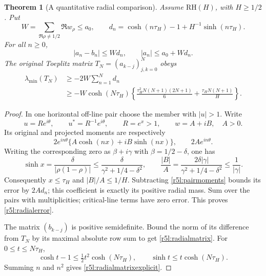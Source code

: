 \documentclass[11pt,a4paper]{article}
\newtheorem{theorem}{Theorem}[section]
\theoremstyle{definition}\newtheorem{definition}[theorem]{Definition}
\theoremstyle{remark}\newtheorem{remark}[theorem]{Remark}
\numberwithin{equation}{section}
\begin{document}
\begin{theorem}[A quantitative radial comparison]
\label{r5l:radialbound}
Assume $\mathrm{RH}(H)$, with $H\ge1/2$.  Put
\[
 W=\sum_{\Re\rho\ne1/2}\Re w_\rho\le a_0,
 \qquad
 d_n=\cosh(n\tau_H)-1+H^{-1}\sinh(n\tau_H).
\]
For all $n\ge0$,
\begin{equation}\label{r5l:radialerror}
 |a_n-b_n|\le Wd_n,
 \qquad |a_n|\le a_0+Wd_n.
\end{equation}
The original Toeplitz matrix $T_N=(a_{k-j})_{j,k=0}^N$ obeys
\begin{align}
 \lambda_{\min}(T_N)
 &\ge-2W\sum_{n=1}^Nd_n\label{r5l:radialmatrix}\\
 &\ge-W\cosh(N\tau_H)
 \left\{\frac{\tau_H^2N(N+1)(2N+1)}6
              +\frac{\tau_HN(N+1)}H\right\}.
       \label{r5l:radialmatrixexplicit}
\end{align}
\end{theorem}
\begin{proof}
In one horizontal off-line pair choose the member with $|u|>1$.
Write
\[
 u=Re^{i\theta},\qquad u^*=R^{-1}e^{i\theta},\qquad
 R=e^x>1,\qquad w=A+iB,\quad A>0.
\]
Its original and projected moments are respectively
\begin{equation}\label{r5l:pairmoments}
 2e^{in\theta}\{A\cosh(nx)+iB\sinh(nx)\},
 \qquad 2Ae^{in\theta}.
\end{equation}
Writing the corresponding zero as $\beta+i\gamma$ with
$\beta=1/2-\delta$, one has
\begin{equation}\label{r5l:radialestimates}
 \sinh x=\frac{\delta}{|\rho(1-\rho)|}
 \le\frac{\delta}{\gamma^2+1/4-\delta^2},
 \qquad
 \frac{|B|}{A}=
 \frac{2\delta|\gamma|}{\gamma^2+1/4-\delta^2}
 \le\frac1{|\gamma|}.
\end{equation}
Consequently $x\le\tau_H$ and $|B|/A\le1/H$.  Subtracting
\eqref{r5l:pairmoments} bounds its error by $2A d_n$; this
coefficient is exactly its positive radial mass.  Sum over the
pairs with multiplicities; critical-line terms have zero error.
This proves \eqref{r5l:radialerror}.

The matrix $(b_{k-j})$ is positive semidefinite.  Bound the norm of
its difference from $T_N$ by its maximal absolute row sum to get
\eqref{r5l:radialmatrix}.  For $0\le t\le N\tau_H$,
\[
 \cosh t-1\le\tfrac12t^2\cosh(N\tau_H),
 \qquad \sinh t\le t\cosh(N\tau_H).
\]
Summing $n$ and $n^2$ gives \eqref{r5l:radialmatrixexplicit}.
\end{proof}
\end{document}
